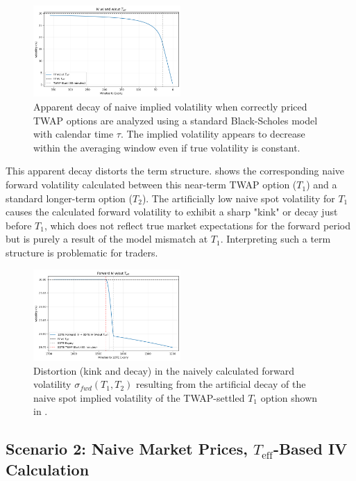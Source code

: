 \documentclass[11pt]{article}
\theoremstyle{plain}
\begin{document}
\begin{figure}[H]
    \centering
    \includegraphics[width=0.5\textwidth]{png2.png}
    \caption{Apparent decay of naive implied volatility when correctly priced TWAP options are analyzed using a standard Black-Scholes model with calendar time $\tau$. The implied volatility appears to decrease within the averaging window even if true volatility is constant.}
    \label{fig:naive_iv_decay}
\end{figure}


This apparent decay distorts the term structure.  shows the corresponding naive forward volatility calculated between this near-term TWAP option ($T_1$) and a standard longer-term option ($T_2$). The artificially low naive spot volatility for $T_1$ causes the calculated forward volatility to exhibit a sharp "kink" or decay just before $T_1$, which does not reflect true market expectations for the forward period but is purely a result of the model mismatch at $T_1$. Interpreting such a term structure is problematic for traders.

\begin{figure}[H]
    \centering
    \includegraphics[width=0.5\textwidth]{png3.png}
    \caption{Distortion (kink and decay) in the naively calculated forward volatility $\sigma_{fwd}(T_1, T_2)$ resulting from the artificial decay of the naive spot implied volatility of the TWAP-settled $T_1$ option shown in .}
    \label{fig:naive_fwd_vol_kink}
\end{figure}



\subsection{Scenario 2: Naive Market Prices, $T_{\mathrm{eff}}$-Based IV Calculation}
\end{document}
